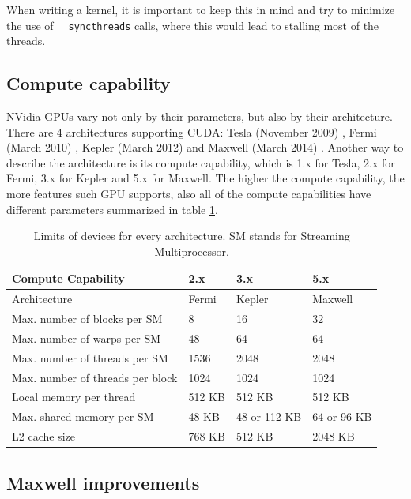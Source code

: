 When writing a kernel, it is important to keep this in mind and try to minimize the use of \verb|__syncthreads| calls, where this would lead to stalling most of the threads.

\subsection{Compute capability}\label{subsec:cuda-compute-capability}

NVidia GPUs vary not only by their parameters, but also by their architecture. There are 4 architectures supporting CUDA: Tesla (November 2009) \cite{lindholm2008nvidia}, Fermi (March 2010) \cite{fermi-whitepaper}, Kepler (March 2012) \cite{kepler-whitepaper} and Maxwell (March 2014) \cite{maxwell-whitepaper}. Another way to describe the architecture is its compute capability, which is 1.x for Tesla, 2.x for Fermi, 3.x for Kepler and 5.x for Maxwell. The higher the compute capability, the more features such GPU supports, also all of the compute capabilities have different parameters summarized in table \ref{tab:compute-capability}.

\begin{table}[ht]
\centering
\begin{tabularx}{\textwidth}{| X | X | X | X |}
\hline
Compute Capability & 2.x & 3.x & 5.x \\
\hline
Architecture & Fermi & Kepler & Maxwell \\
\hline
Max. number of blocks per SM & 8 & 16 & 32 \\
\hline
Max. number of warps per SM & 48 & 64 & 64 \\
\hline
Max. number of threads per SM & 1536 & 2048 & 2048 \\
\hline
Max. number of threads per block & 1024 & 1024 & 1024 \\
\hline
Local memory per thread & 512 KB & 512 KB & 512 KB \\
\hline
Max. shared memory per SM & 48 KB & 48 or 112 KB & 64 or 96 KB \\
\hline
L2 cache size & 768 KB & 512 KB & 2048 KB \\
\hline
\end{tabularx}
\caption{Limits of devices for every architecture. SM stands for Streaming Multiprocessor.}
\label{tab:compute-capability}
\end{table}

\subsection{Maxwell improvements}\label{subsec:cuda-maxwell-imp}

